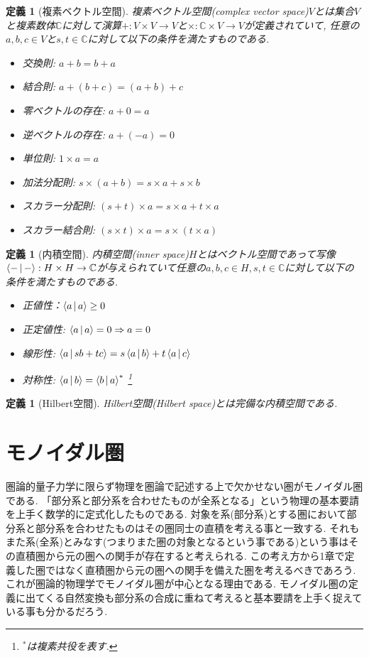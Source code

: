 \documentclass[a4paper,12pt]{ltjsarticle}
\theoremstyle{break}
\newtheorem{defn}[thm]{定義}
\newcommand{\mbc}{\mathbb{C}}
\newcommand{\ra}{\Rightarrow}
\newcommand{\ti}{\times}
\numberwithin{equation}{section}
\begin{document}
\begin{defn}[複素ベクトル空間]
  複素ベクトル空間(complex vector space)$V$とは集合$V$と複素数体$\mbc$に対して演算$+: V \ti V \to V$と$\ti: \mbc \ti V \to V$が定義されていて, 任意の$a, b, c \in V$と$s,t \in \mbc$に対して以下の条件を満たすものである. 
  \begin{itemize}
    \item 交換則: $a + b = b + a$
    \item 結合則: $a + (b + c) = (a + b) + c$
    \item 零ベクトルの存在: $a + 0 = a$
    \item 逆ベクトルの存在: $a + (-a) = 0$
    \item 単位則: $1 \ti a = a$
    \item 加法分配則: $s \ti (a + b) = s \ti a + s \ti b$
    \item スカラー分配則: $(s + t) \ti a = s \ti a + t \ti a$
    \item スカラー結合則:  $(s \ti t) \ti a = s \ti (t \ti a)$
  \end{itemize}
\end{defn}

\begin{defn}[内積空間]
  内積空間(inner space)$H$とはベクトル空間であって写像$\Braket{-|-}: H \ti H \to \mbc$が与えられていて任意の$a,b,c \in H, s,t \in \mbc$に対して以下の条件を満たすものである. 
  \begin{itemize}
    \item 正値性：$\Braket{a|a} \geq 0$
    \item 正定値性: $\Braket{a|a}=0 \ra a=0$
    \item 線形性: $\Braket{a|sb+tc} = s\Braket{a|b}+t\Braket{a|c}$
    \item 対称性: $\Braket{a|b}=\Braket{b|a}^*$
    \footnote{
      ${}^*$は複素共役を表す. 
    }
  \end{itemize}
\end{defn}

\begin{defn}[Hilbert空間]
  Hilbert空間(Hilbert space)とは完備な内積空間である. 
\end{defn}  

\newpage

\section{モノイダル圏}

圏論的量子力学に限らず物理を圏論で記述する上で欠かせない圏がモノイダル圏である. 
「部分系と部分系を合わせたものが全系となる」という物理の基本要請を上手く数学的に定式化したものである. 
対象を系(部分系)とする圏において部分系と部分系を合わせたものはその圏同士の直積を考える事と一致する. 
それもまた系(全系)とみなす(つまりまた圏の対象となるという事である)という事はその直積圏から元の圏への関手が存在すると考えられる. 
この考え方から1章で定義した圏ではなく直積圏から元の圏への関手を備えた圏を考えるべきであろう. \\
これが圏論的物理学でモノイダル圏が中心となる理由である. 
モノイダル圏の定義に出てくる自然変換も部分系の合成に重ねて考えると基本要請を上手く捉えている事も分かるだろう. 
\end{document}

